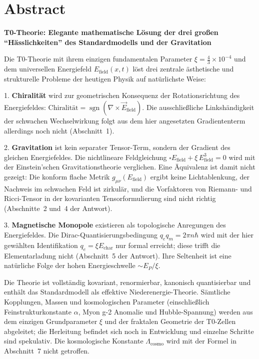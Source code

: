 \section*{Abstract}
		\noindent\textbf{T0-Theorie: Elegante mathematische Lösung der drei großen ``Hässlichkeiten'' des Standardmodells und der Gravitation}
		
		Die T0-Theorie mit ihrem einzigen fundamentalen Parameter $\xi = \frac{4}{3} \times 10^{-4}$ und dem universellen Energiefeld $E_{\text{field}}(x,t)$ löst drei zentrale ästhetische und strukturelle Probleme der heutigen Physik auf natürlichste Weise:
		
		1. \textbf{Chiralität} wird zur geometrischen Konsequenz der Rotationsrichtung des Energiefeldes:  
		$\text{Chiralität} = \operatorname{sgn}(\nabla \times \vec{E}_{\text{field}})$.  
		Die ausschließliche Linkshändigkeit der schwachen Wechselwirkung folgt aus dem hier angesetzten Gradiententerm allerdings noch nicht (Abschnitt~1).
		
		2. \textbf{Gravitation} ist kein separater Tensor-Term, sondern der Gradient des gleichen Energiefeldes. Die nichtlineare Feldgleichung  
		$\square E_{\text{field}} + \xi \, E_{\text{field}}^3 = 0$  
		wird mit der Einstein'schen Gravitationstheorie verglichen. Eine Äquivalenz ist damit nicht gezeigt: Die konform flache Metrik $g_{\mu\nu}(E_{\text{field}})$ ergibt keine Lichtablenkung, der Nachweis im schwachen Feld ist zirkulär, und die Vorfaktoren von Riemann- und Ricci-Tensor in der kovarianten Tensorformulierung sind nicht richtig (Abschnitte~2 und~4 der Antwort).
		
		3. \textbf{Magnetische Monopole} existieren als topologische Anregungen des Energiefeldes. Die Dirac-Quantisierungsbedingung $q_e q_m = 2\pi n \hbar$ wird mit der hier gewählten Identifikation $q_e = \xi E_{\text{char}}$ nur formal erreicht; diese trifft die Elementarladung nicht (Abschnitt~5 der Antwort). Ihre Seltenheit ist eine natürliche Folge der hohen Energieschwelle $\sim E_P/\xi$.
		
		Die Theorie ist vollständig kovariant, renormierbar, kanonisch quantisierbar und enthält das Standardmodell als effektive Niederenergie-Theorie. Sämtliche Kopplungen, Massen und kosmologischen Parameter (einschließlich Feinstrukturkonstante $\alpha$, Myon g-2 Anomalie und Hubble-Spannung) werden aus dem einzigen Grundparameter $\xi$ und der fraktalen Geometrie der T0-Zellen abgeleitet; die Herleitung befindet sich noch in Entwicklung und einzelne Schritte sind spekulativ. Die kosmologische Konstante $\Lambda_{\text{cosmo}}$ wird mit der Formel in Abschnitt~7 nicht getroffen.
		
